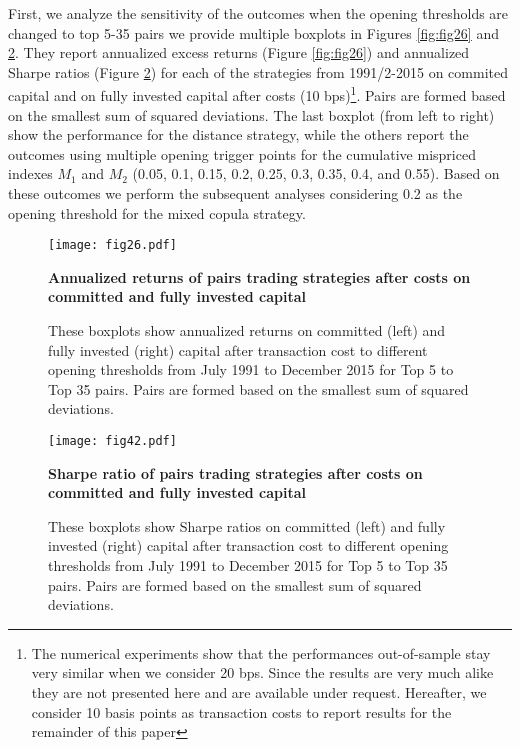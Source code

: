 \documentclass[a4paper]{article}
\begin{document}
First, we analyze the sensitivity of the outcomes when the opening thresholds are changed to top 5-35 pairs we provide multiple boxplots in Figures \ref{fig:fig26} and \ref{fig:fig42}. They report annualized excess returns (Figure \ref{fig:fig26}) and annualized Sharpe ratios (Figure \ref{fig:fig42}) for each of the strategies from 1991/2-2015 on commited capital and on fully invested capital after costs (10 bps)\footnote{The numerical experiments show that the performances out-of-sample stay very similar when we consider 20 bps. Since the results are very much alike they are not presented here and are available under request. Hereafter, we consider 10 basis points as transaction costs to report results for the remainder of this paper}. Pairs are formed based on the smallest sum of squared deviations. The last boxplot (from left to right) show the performance for the distance strategy, while the others report the outcomes using multiple opening trigger points for the cumulative mispriced indexes $M_{1}$ and $M_{2}$ (0.05, 0.1, 0.15, 0.2, 0.25, 0.3, 0.35, 0.4, and 0.55). Based on these outcomes we perform the subsequent analyses considering 0.2 as the opening threshold for the mixed copula strategy.

\begin{figure}[H]
	\centering
	\texttt{[image: fig26.pdf]}
	\caption{\textbf{Annualized returns of pairs trading strategies after costs on committed and fully invested capital}}
	\caption*{\scriptsize These boxplots show annualized returns on committed (left) and fully invested (right) capital after transaction cost to different opening thresholds from July 1991 to December 2015 for Top 5 to Top 35 pairs. Pairs are formed based on the smallest sum of squared deviations.}
	\label{fig:fig25}
\end{figure}


\begin{figure}[H]
	\centering \tiny
	\texttt{[image: fig42.pdf]}
	\caption{\textbf {Sharpe ratio of pairs trading strategies after costs on committed and fully invested capital}}
	\caption*{\justifying \scriptsize These boxplots show Sharpe ratios on committed (left) and fully invested (right) capital after transaction cost to different opening thresholds from July 1991 to December 2015 for Top 5 to Top 35 pairs. Pairs are formed based on the smallest sum of squared deviations.}
	\label{fig:fig42}
\end{figure}
\end{document}

